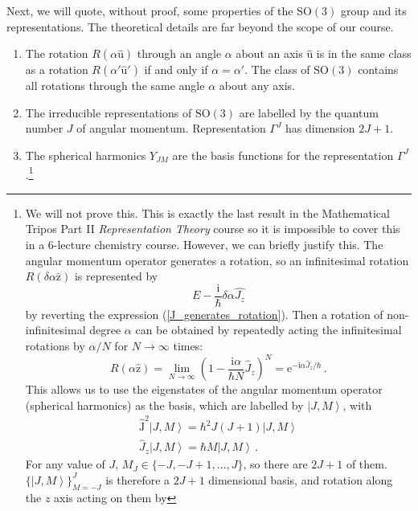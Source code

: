 \documentclass{article}
\theoremstyle{plain}\theoremheaderfont{\normalfont\itshape}\theorembodyfont{\rmfamily}\theoremseparator{.}\newtheorem*{rem}{Remark}\newtheorem*{ex}{Example}\newtheorem*{proof}{Proof}\newtheorem*{altp}{Alternative proof}
\theoremstyle{plain}\theoremheaderfont{\normalfont\bfseries}\theorembodyfont{\rmfamily}\theoremseparator{.}\newtheorem{thm}{Theorem}[section]\newtheorem{lem}[thm]{Lemma}\newtheorem{prop}[thm]{Proposition}\newtheorem*{cor}{Corollary}\newtheorem{defn}[thm]{Definition}\newtheorem{clm}[thm]{Claim}\newtheorem{clminproof}{Claim}\newtheorem*{law}{Law}\newtheorem{pos}[thm]{Postulate}
\theoremstyle{break}\theoremheaderfont{\normalfont\itshape}\theorembodyfont{\rmfamily}\theoremseparator{.\medskip}\newtheorem*{proofskip}{Proof}\newtheorem*{exs}{Examples}\newtheorem*{rems}{Remarks}
\theoremstyle{break}\theoremheaderfont{\normalfont\bfseries}\theorembodyfont{\rmfamily}\theoremseparator{.\medskip}\newtheorem{lemskip}[thm]{Lemma}\newtheorem{defnskip}[thm]{Definition}\newtheorem{propskip}[thm]{Proposition}\newtheorem{thmskip}[thm]{Theorem}
\numberwithin{equation}{section}
\newcommand{\ii}{\mathrm{i}}
\newcommand{\ee}{\mathrm{e}}
\newcommand{\ket}[1]{\left| #1 \right\rangle}
\newcommand{\vb}[1]{\bm{\mathrm{#1}}}
\newcommand{\vu}[1]{\hat{\bm{\mathrm{#1}}}}
\newcommand{\SO}{\mathrm{SO}}
\begin{document}
    Next, we will quote, without proof, some properties of the \(\SO(3)\) group and its representations. The theoretical details are far beyond the scope of our course.
    \begin{enumerate}[topsep=0pt,label=(\roman*)]
        \item The rotation \(R(\alpha\vu{u})\) through an angle \(\alpha\) about an axis \(\vu{u}\) is in the same class as a rotation \(R(\alpha'\vu{u}')\) if and only if \(\alpha=\alpha'\). The class of \(\SO(3)\) contains all rotations through the same angle \(\alpha\) about any axis.
        \item The irreducible representations of \(\SO(3)\) are labelled by the quantum number \(J\) of angular momentum. Representation \(\Gamma^{J}\) has dimension \(2J+1\).
        \item The spherical harmonics \(Y_{JM}\) are the basis functions for the representation \(\Gamma^{J}\).\footnote{We will not prove this. This is exactly the last result in the Mathematical Tripos Part II \textit{Representation Theory} course so it is impossible to cover this in a 6-lecture chemistry course. However, we can briefly justify this. The angular momentum operator generates a rotation, so an infinitesimal rotation \(R(\delta\alpha\vu{z})\) is represented by
        \begin{equation}
            E-\frac{\ii}{\hbar}\delta\alpha\hat{J_z}
        \end{equation}
        by reverting the expression (\ref{J_generates_rotation}). Then a rotation of non-infinitesimal degree \(\alpha\) can be obtained by repeatedly acting the infinitesimal rotations by \(\alpha/N\) for \(N\to\infty\) times:
        \begin{equation}
            R(\alpha\vu{z})=\lim_{N\to\infty}\left(1-\frac{\ii\alpha}{\hbar N}\hat{J}_z\right)^N=\ee^{-\ii\alpha\hat{J}_z/\hbar}\,.
        \end{equation}
        This allows us to use the eigenstates of the angular momentum operator (spherical harmonics) as the basis, which are labelled by \(\ket{J,M}\), with
        \begin{align}
            \hat{\vb{J}}^2\ket{J,M}=\hbar^2 J(J+1)\ket{J,M}\\
            \hat{J}_z\ket{J,M}=\hbar M\ket{J,M}\,.
        \end{align}
        For any value of \(J\), \(M_J\in\{-J,-J+1,\dots,J\}\), so there are \(2J+1\) of them. \(\{\ket{J,M}\}_{M=-J}^{J}\) is therefore a \(2J+1\) dimensional basis, and rotation along the \(z\) axis acting on them by
}
\end{enumerate}
\end{document}
